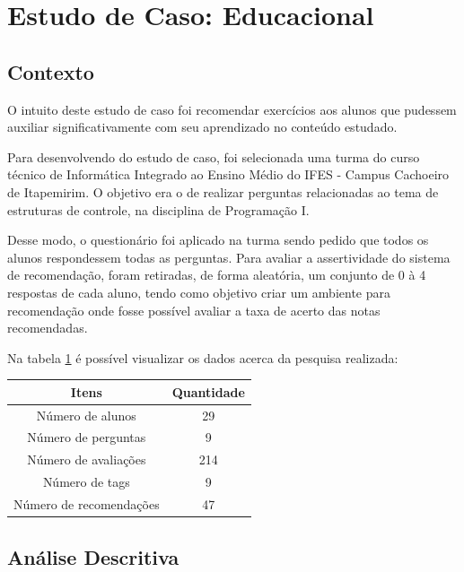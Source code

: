 \section{Estudo de Caso: Educacional}

\subsection{Contexto}

O intuito deste estudo de caso foi recomendar exercícios aos alunos que pudessem auxiliar significativamente com seu aprendizado no conteúdo estudado.

Para desenvolvendo do estudo de caso, foi selecionada uma turma do curso técnico de Informática Integrado ao Ensino Médio do IFES - Campus Cachoeiro de Itapemirim. O objetivo era o de realizar perguntas relacionadas ao tema de estruturas de controle, na disciplina de Programação I.

Desse modo, o questionário foi aplicado na turma sendo pedido que todos os alunos respondessem todas as perguntas. Para avaliar a assertividade do sistema de recomendação, foram retiradas, de forma aleatória, um conjunto de 0 à 4 respostas de cada aluno, tendo como objetivo criar um ambiente para recomendação onde fosse possível avaliar a taxa de acerto das notas recomendadas.

Na tabela \ref{table:resultadosEstudoCasoEdu} é possível visualizar os dados acerca da pesquisa realizada:

\begin{table}[H]
\centering
\begin{tabular}{|c|c|}
\hline
\textbf{Itens}          & \textbf{Quantidade} \\ \hline
Número de alunos        & 29                  \\ \hline
Número de perguntas     & 9                   \\ \hline
Número de avaliações    & 214                 \\ \hline
Número de tags          & 9                   \\ \hline
Número de recomendações & 47                  \\ \hline
\end{tabular}
\label{table:resultadosEstudoCasoEdu} 
\end{table}

\subsection{Análise Descritiva}

